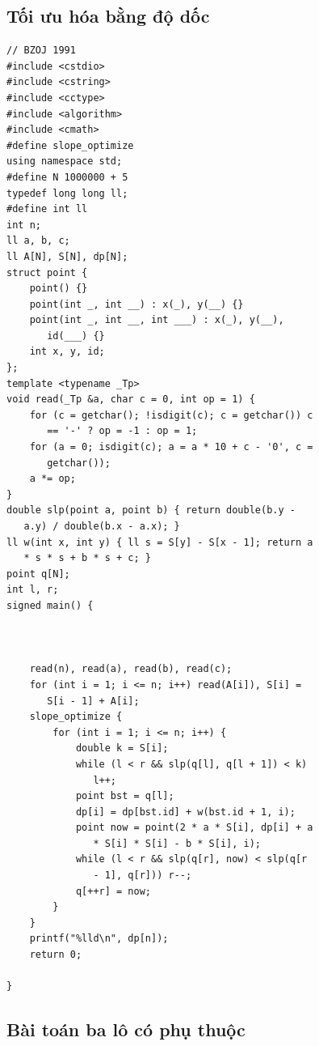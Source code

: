 \documentclass[11pt]{article}
\begin{document}
\subsection{Tối ưu hóa bằng độ dốc}

\begingroup
\footnotesize
\begin{verbatim}
// BZOJ 1991
#include <cstdio>
#include <cstring>
#include <cctype>
#include <algorithm>
#include <cmath>
#define slope_optimize
using namespace std;
#define N 1000000 + 5
typedef long long ll;
#define int ll
int n;
ll a, b, c;
ll A[N], S[N], dp[N];
struct point {
    point() {}
    point(int _, int __) : x(_), y(__) {}
    point(int _, int __, int ___) : x(_), y(__),
       id(___) {}
    int x, y, id;
};
template <typename _Tp>
void read(_Tp &a, char c = 0, int op = 1) {
    for (c = getchar(); !isdigit(c); c = getchar()) c
       == '-' ? op = -1 : op = 1;
    for (a = 0; isdigit(c); a = a * 10 + c - '0', c =
       getchar());
    a *= op;
}
double slp(point a, point b) { return double(b.y -
   a.y) / double(b.x - a.x); }
ll w(int x, int y) { ll s = S[y] - S[x - 1]; return a
   * s * s + b * s + c; }
point q[N];
int l, r;
signed main() {



    read(n), read(a), read(b), read(c);
    for (int i = 1; i <= n; i++) read(A[i]), S[i] =
       S[i - 1] + A[i];
    slope_optimize {
        for (int i = 1; i <= n; i++) {
            double k = S[i];
            while (l < r && slp(q[l], q[l + 1]) < k)
               l++;
            point bst = q[l];
            dp[i] = dp[bst.id] + w(bst.id + 1, i);
            point now = point(2 * a * S[i], dp[i] + a
               * S[i] * S[i] - b * S[i], i);
            while (l < r && slp(q[r], now) < slp(q[r
               - 1], q[r])) r--;
            q[++r] = now;
        }
    }
    printf("%lld\n", dp[n]);
    return 0;

}
\end{verbatim}
\endgroup

\subsection{Bài toán ba lô có phụ thuộc}
\end{document}
